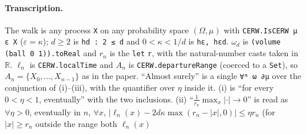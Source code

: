 \paragraph{Transcription.}
The walk is any process \texttt{X} on any probability space $(\Omega,\mu)$ with \texttt{CERW.IsCERW μ ε X} ($\varepsilon=\kappa$); $d\ge2$ is \texttt{hd : 2 ≤ d} and $0<\kappa<1/d$ is \texttt{hε, hεd}. $\omega_d$ is \texttt{(volume (ball 0 1)).toReal} and $r_n$ is the \texttt{let} \texttt{r}, with the natural-number casts taken in $\mathbb R$. $\ell_n$ is \texttt{CERW.localTime} and $A_n$ is \texttt{CERW.departureRange} (coerced to a \texttt{Set}), so $A_n=\{X_0,\dots,X_{n-1}\}$ as in the paper. ``Almost surely'' is a single \texttt{∀ᵐ ω ∂μ} over the conjunction of (i)--(iii), with the quantifier over $\eta$ inside it. (i) is ``for every $0<\eta<1$, eventually'' with the two inclusions. (ii) ``$\frac1{r_n}\max_x|\cdot|\to0$'' is read as $\forall\eta>0$, eventually in $n$, $\forall x$, $|\ell_n(x)-2d\kappa\max(r_n-|x|,0)|\le\eta r_n$ (for $|x|\ge r_n$ outside the range both $\ell_n(x)$
